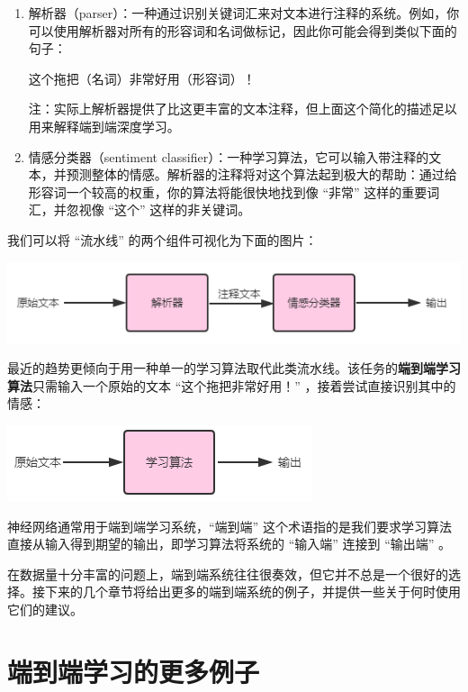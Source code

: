 \begin{enumerate}
\def\labelenumi{\arabic{enumi}.}
\item
  解析器（parser）：一种通过识别关键词汇来对文本进行注释的系统。例如，你可以使用解析器对所有的形容词和名词做标记，因此你可能会得到类似下面的句子：

  \hspace{0pt} 这个拖把（名词）非常好用（形容词）！

  注：实际上解析器提供了比这更丰富的文本注释，但上面这个简化的描述足以用来解释端到端深度学习。
\item
  情感分类器（sentiment
  classifier）：一种学习算法，它可以输入带注释的文本，并预测整体的情感。解析器的注释将对这个算法起到极大的帮助：通过给形容词一个较高的权重，你的算法将能很快地找到像
  ``非常'' 这样的重要词汇，并忽视像 ``这个'' 这样的非关键词。
\end{enumerate}

我们可以将 ``流水线'' 的两个组件可视化为下面的图片：

\includegraphics{./img/ch47_01.png}

最近的趋势更倾向于用一种单一的学习算法取代此类流水线。该任务的\textbf{端到端学习算法}只需输入一个原始的文本
``这个拖把非常好用！'' ，接着尝试直接识别其中的情感：

\includegraphics{./img/ch47_02.png}

神经网络通常用于端到端学习系统，``端到端''
这个术语指的是我们要求学习算法直接从输入得到期望的输出，即学习算法将系统的
``输入端'' 连接到 ``输出端'' 。

在数据量十分丰富的问题上，端到端系统往往很奏效，但它并不总是一个很好的选择。接下来的几个章节将给出更多的端到端系统的例子，并提供一些关于何时使用它们的建议。

\hypertarget{ux7aefux5230ux7aefux5b66ux4e60ux7684ux66f4ux591aux4f8bux5b50}{%
\chapter{端到端学习的更多例子}\label{ux7aefux5230ux7aefux5b66ux4e60ux7684ux66f4ux591aux4f8bux5b50}}

